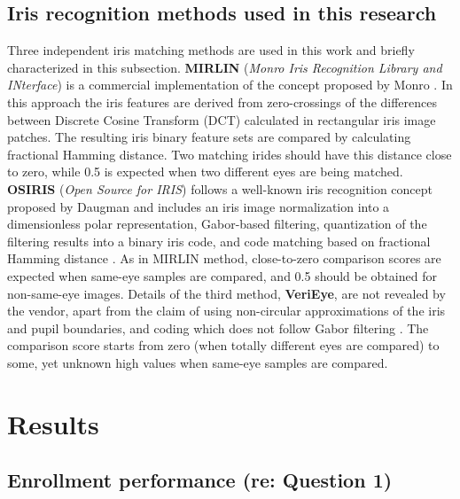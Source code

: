 \documentclass[10pt,twocolumn,letterpaper]{article}
\begin{document}
\subsection{Iris recognition methods used in this research}

Three independent iris matching methods are used in this work and briefly characterized in this subsection. {\bf MIRLIN} ({\it Monro Iris Recognition Library and INterface}) is a commercial implementation of the concept proposed by Monro \etal \cite{Monro2007}. In this approach the iris features are derived from zero-crossings of the differences between Discrete Cosine Transform (DCT) calculated in rectangular iris image patches. The resulting iris binary feature sets are compared by calculating fractional Hamming distance. Two matching irides should have this distance close to zero, while 0.5 is expected when two different eyes are being matched. {\bf OSIRIS} ({\it Open Source for IRIS}) follows a well-known iris recognition concept proposed by Daugman and includes an iris image normalization into a dimensionless polar representation, Gabor-based filtering, quantization of the filtering results into a binary iris code, and code matching based on fractional Hamming distance \cite{OSIRIS}. As in MIRLIN method, close-to-zero comparison scores are expected when same-eye samples are compared, and 0.5 should be obtained for non-same-eye images. Details of the third method, {\bf VeriEye}, are not revealed by the vendor, apart from the claim of using non-circular approximations of the iris and pupil boundaries, and coding which does not follow Gabor filtering \cite{VeriEye}. The comparison score starts from zero (when totally different eyes are compared) to some, yet unknown high values when same-eye samples are compared.

\section{Results}
\label{sec:results}

\subsection{Enrollment performance (re: Question 1)}

\end{document}
